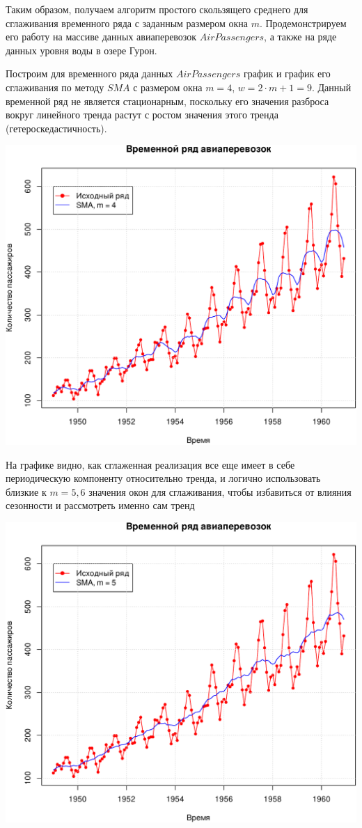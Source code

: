 \documentclass[
]{article}
\begin{document}
Таким образом, получаем алгоритм простого скользящего среднего для
сглаживания временного ряда с заданным размером окна \(m\).
Продемонстрируем его работу на массиве данных авиаперевозок
\(AirPassengers\), а также на ряде данных уровня воды в озере Гурон.

Построим для временного ряда данных \(AirPassengers\) график и график
его сглаживания по методу \(SMA\) с размером окна \(m = 4\),
\(w = 2\cdot m + 1 = 9\). Данный временной ряд не является стационарным,
поскольку его значения разброса вокруг линейного тренда растут с ростом
значения этого тренда (гетероскедастичность).

\begin{center}\includegraphics[width=0.6\linewidth]{Prac6_files/figure-latex/unnamed-chunk-4-1} \end{center}

На графике видно, как сглаженная реализация все еще имеет в себе
периодическую компоненту относительно тренда, и логично использовать
близкие к \(m = 5, 6\) значения окон для сглаживания, чтобы избавиться
от влияния сезонности и рассмотреть именно сам тренд

\begin{center}\includegraphics[width=0.6\linewidth]{Prac6_files/figure-latex/unnamed-chunk-5-1} \end{center}
\end{document}
